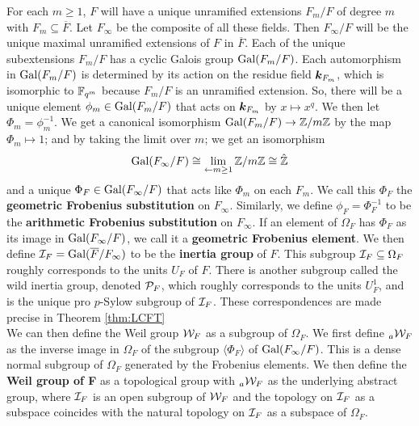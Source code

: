 For each $m \geq 1$, $F$ will have a unique unramified extensions $F_m/F$ of degree $m$ with $F_m \subseteq \overline{F}$.
Let $F_\infty$ be the composite of all these fields.
Then $F_\infty/F$ will be the unique maximal unramified extensions of $F$ in $\overline{F}$.
Each of the unique subextensions $F_m/F$ has a cyclic Galois group $\textrm{Gal}(F_m/F)$.
Each automorphism in $\textrm{Gal}(F_m/F)$ is determined by its action on the residue field $\bm{k}_{F_m}$, which is isomorphic to $\mathbb{F}_{q^m}$ because $F_m/F$ is an unramified extension.
So, there will be a unique element $\phi_m \in \textrm{Gal}(F_m/F)$ that acts on $\bm{k}_{F_m}$ by $x \mapsto x^q$.
We then let $\Phi_m = \phi_m^{-1}$.
We get a canonical isomorphism $\textrm{Gal}(F_m/F) \to \mathbb{Z}/m\mathbb{Z}$ by the map $\Phi_m \mapsto 1$; and by taking the limit over $m$; we get an isomorphism
\[\textrm{Gal}(F_\infty/F) \cong \lim_{\leftarrow m \geq 1} \mathbb{Z}/m\mathbb{Z} \cong \hat{\mathbb{Z}}\]
and a unique $\Phi_F \in \textrm{Gal}(F_\infty/F)$ that acts like $\Phi_m$ on each $F_m$.
We call this $\Phi_F$ the \textbf{geometric Frobenius substitution} on $F_\infty$.
Similarly, we define $\phi_F = \Phi_F^{-1}$ to be the \textbf{arithmetic Frobenius substitution} on $F_\infty$.
If an element of $\Omega_F$ has $\Phi_F$ as its image in $\textrm{Gal}(F_\infty/F)$, we call it a \textbf{geometric Frobenius element}.
We then define $\mathcal{I}_F = \textrm{Gal}(\overline{F}/F_\infty)$ to be the \textbf{inertia group} of $F$.
This subgroup $\mathcal{I}_F \subseteq \Omega_F$ roughly corresponds to the units $U_F$ of $F$.
There is another subgroup called the wild inertia group, denoted $\mathcal{P}_F$, which roughly corresponds to the units $U_F^1$, and is the unique pro $p$-Sylow subgroup of $\mathcal{I}_F$.
These correspondences are made precise in Theorem \ref{thm:LCFT}
\\

We can then define the Weil group $\mathcal{W}_F$ as a subgroup of $\Omega_F$.
We first define ${}_a\mathcal{W}_F$ as the inverse image in $\Omega_F$ of the subgroup $\langle \Phi_F\rangle$ of $\textrm{Gal}(F_\infty/F)$.
This is a dense normal subgroup of $\Omega_F$ generated by the Frobenius elements.
We then define the \textbf{Weil group of F} as a topological group with ${}_a\mathcal{W}_F$ as the underlying abstract group, where $\mathcal{I}_F$ is an open subgroup of $\mathcal{W}_F$ and the topology on $\mathcal{I}_F$ as a subspace coincides with the natural topology on $\mathcal{I}_F$ as a subspace of $\Omega_F$.
\\

